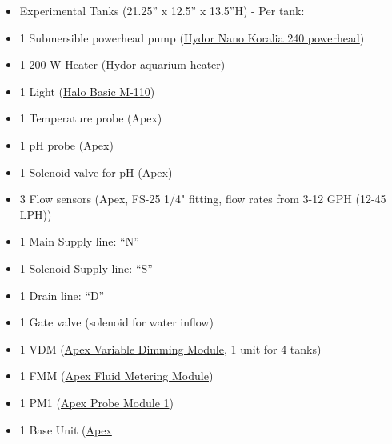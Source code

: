 \documentclass[]{book}
\providecommand{\tightlist}{%
  \setlength{\itemsep}{0pt}\setlength{\parskip}{0pt}}
\begin{document}
\begin{itemize}
\tightlist
\item
  Experimental Tanks (21.25'' x 12.5'' x 13.5''H) - Per tank:\\
\item
  1 Submersible powerhead pump
  (\href{https://github.com/SilbigerLab/Mesocosm_User_Manual/blob/master/Manuals/Hydor_Nano_Pump.pdf}{Hydor
  Nano Koralia 240 powerhead})\\
\item
  1 200 W Heater
  (\href{https://github.com/SilbigerLab/Mesocosm_User_Manual/blob/master/Manuals/Hydor_Heater.pdf}{Hydor
  aquarium heater})\\
\item
  1 Light
  (\href{https://github.com/SilbigerLab/Mesocosm_User_Manual/blob/master/Manuals/Apex_Halo.pdf}{Halo
  Basic M-110})\\
\item
  1 Temperature probe (Apex)\\
\item
  1 pH probe (Apex)\\
\item
  1 Solenoid valve for pH (Apex)\\
\item
  3 Flow sensors (Apex, FS-25 1/4" fitting, flow rates from 3-12 GPH
  (12-45 LPH))\\
\item
  1 Main Supply line: ``N''
\item
  1 Solenoid Supply line: ``S''
\item
  1 Drain line: ``D''
\item
  1 Gate valve (solenoid for water inflow)\\
\item
  1 VDM
  (\href{https://github.com/SilbigerLab/Mesocosm_User_Manual/blob/master/Manuals/VDM_manual.pdf}{Apex
  Variable Dimming Module}, 1 unit for 4 tanks)\\
\item
  1 FMM (\href{https://www.neptunesystems.com/getstarted/fmk/}{Apex
  Fluid Metering Module})\\
\item
  1 PM1
  (\href{https://github.com/SilbigerLab/Mesocosm_User_Manual/blob/master/Manuals/PM1_manual.pdf}{Apex
  Probe Module 1})\\
\item
  1 Base Unit
  (\href{https://github.com/SilbigerLab/Mesocosm_User_Manual/blob/master/Manuals/Apex_Comprehensive_Reference_Manual.pdf}{Apex}

\end{itemize}
\end{document}
